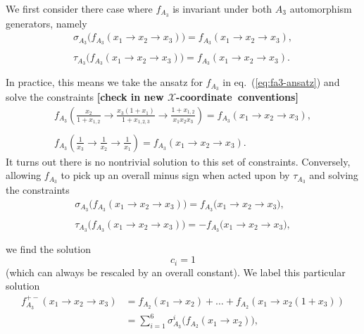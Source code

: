 \documentclass[11pt]{article}
\def\xcoord{$\mathcal{X}$-coordinate}
\def\draftnote#1{{\bf [#1]}}
\begin{document}
We first consider there case where $f_{A_3}$ is invariant under both $A_3$ automorphism generators, namely
\begin{equation}\label{eq:fA3++}
\begin{gathered}
	\sigma_{A_3}\big(f_{A_3} (x_1 \to x_2\to x_3) \big) = f_{A_3}(x_1 \to x_2\to x_3),\\ \\[-1.2em]
	\tau_{A_3}\big(f_{A_3} (x_1 \to x_2\to x_3) \big) = f_{A_3}(x_1 \to x_2\to x_3). \\ \\[-1.4em]
\end{gathered}
\end{equation}
In practice, this means we take the ansatz for $f_{A_3}$ in eq.~(\ref{eq:fa3-ansatz}) and solve the constraints  \draftnote{check in new \xcoord\ conventions}
\begin{equation}
\begin{gathered}
	f_{A_3}\left(\frac{x_2}{1+ x_{1,2}}\to \frac{x_3(1+x_1)}{1+x_{1,2,3}}\to \frac{1+x_{1,2}}{x_1x_2x_3}\right) = f_{A_3}(x_1\to x_2\to x_3),\\ \\[-1.4em]
	f_{A_3}\left(\frac{1}{x_3} \to \frac{1}{x_2} \to \frac{1}{x_1}\right) = f_{A_3}(x_1\to x_2\to x_3).  
\end{gathered}
\end{equation}
It turns out there is no nontrivial solution to this set of constraints. Conversely, allowing $f_{A_3}$ to pick up an overall minus sign when acted upon by $\tau_{A_3}$ and solving the constraints
\begin{equation}
\begin{gathered}
	\sigma_{A_3}\big(f_{A_3}(x_1\to x_2\to x_3)\big) = f_{A_3}\big(x_1\to x_2\to x_3 \big),\\ \\[-1.2em]
	 \tau_{A_3}\big(f_{A_3}(x_1\to x_2\to x_3)\big) = -f_{A_3}\big(x_1\to x_2\to x_3 \big),  \\ \\[-1.4em]
\end{gathered}
\end{equation}
we find the solution 
\begin{equation}
	c_i = 1
\end{equation}
(which can always be rescaled by an overall constant). We label this particular solution
\begin{align}
	f_{A_3}^{+-}(x_1\to x_2\to x_3) &= f_{A_2}(x_1 \to x_2) + \ldots + f_{A_2}(x_1\to x_2 \left(1+x_3\right)) \nonumber \\
	&= \sum_{i=1}^6 \sigma_{A_3}^i\big(f_{A_2}(x_1\to x_2)\big),
\end{align}
\end{document}
